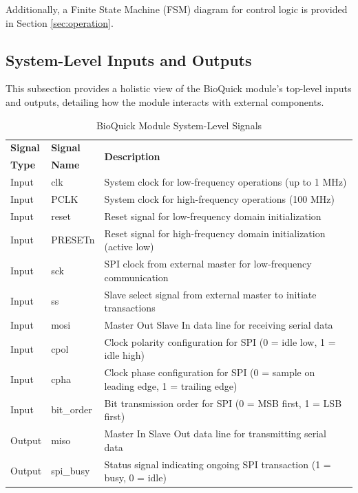 Additionally, a Finite State Machine (FSM) diagram for control logic is provided in Section \ref{sec:operation}.

\subsection{System-Level Inputs and Outputs}

This subsection provides a holistic view of the BioQuick module's top-level inputs and outputs, detailing how the module interacts with external components.

\begin{table}[!htb]
    \centering
    \caption{BioQuick Module System-Level Signals}
    \label{tab:system-level-signals}
    \begin{tabular}{|m{}|m{}|m{}|}
        \hline
        \textbf{Signal} & \textbf{Signal} & \multirow{2}{*}{\textbf{Description}} \\
        \textbf{Type} & \textbf{Name} & \\
        \hline
        Input & clk & System clock for low-frequency operations (up to 1 MHz) \\
        Input & PCLK & System clock for high-frequency operations (100 MHz) \\
        Input & reset & Reset signal for low-frequency domain initialization \\
        Input & PRESETn & Reset signal for high-frequency domain initialization (active low) \\
        Input & sck & SPI clock from external master for low-frequency communication \\
        Input & ss & Slave select signal from external master to initiate transactions \\
        Input & mosi & Master Out Slave In data line for receiving serial data \\
        Input & cpol & Clock polarity configuration for SPI (0 = idle low, 1 = idle high) \\
        Input & cpha & Clock phase configuration for SPI (0 = sample on leading edge, 1 = trailing edge) \\
        Input & bit\_order & Bit transmission order for SPI (0 = MSB first, 1 = LSB first) \\
        Output & miso & Master In Slave Out data line for transmitting serial data \\
        Output & spi\_busy & Status signal indicating ongoing SPI transaction (1 = busy, 0 = idle) \\
        \hline
    \end{tabular}
\end{table}

